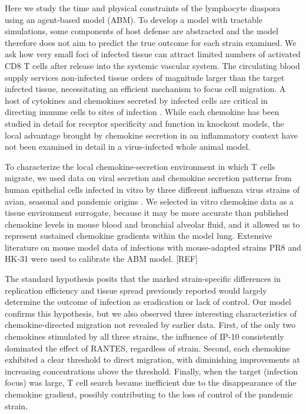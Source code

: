 \documentclass[10pt]{article}
\begin{document}
Here we study the time and physical constraints of the lymphocyte diaspora using an agent-based model (ABM).  To develop a model with tractable simulations, some components of host defense are abstracted and the model therefore does not aim to predict the true outcome for each strain examined.   We ask how very small foci of infected tissue can attract limited numbers of activated CD8 T cells after release into the systemic vascular system.  The circulating blood supply services non-infected tissue orders of magnitude larger than the target infected tissue, necessitating an efficient mechanism to focus cell migration.   A host of cytokines and chemokines secreted by infected cells are critical in directing immune cells to sites of infection \cite{Miao2010, Zhao2000, LiJeon2002}.  While each chemokine has been studied in detail for receptor specificity and function in knockout models, the local advantage brought by chemokine secretion in an inflammatory context have not been examined in detail in a virus-infected whole animal model.  

To characterize the local chemokine-secretion environment in which T cells migrate, we used data on viral secretion and chemokine secretion patterns from human epithelial cells infected in vitro by three different influenza virus strains of avian, seasonal and pandemic origins \cite{Mitchell2011}.   We selected in vitro chemokine data as a tissue environment surrogate, because it may be more accurate than published chemokine levels in mouse blood and bronchial alveolar fluid, and it allowed us to represent sustained chemokine gradients within the model lung.  Extensive literature on mouse model data of infections with mouse-adapted strains PR8 and HK-31 were used to calibrate the ABM model. [REF]

The standard hypothesis posits that the marked strain-specific differences in replication efficiency and tissue spread previously reported \cite{Mitchell2011} would largely determine the outcome of infection as eradication or lack of control.  Our model confirms this hypothesis, but we also observed three interesting characteristics of chemokine-directed migration not revealed by earlier data.  First, of the only two chemokines stimulated by all three strains, the influence of IP-10 consistently dominated the effect of RANTES, regardless of strain.  Second, each chemokine exhibited a clear threshold to direct migration, with diminishing improvements at increasing concentrations above the threshold.  Finally, when the target (infection focus) was large, T cell search became inefficient due to the disappearance of the chemokine gradient, possibly contributing to the loss of control of the pandemic strain.  
\end{document}
